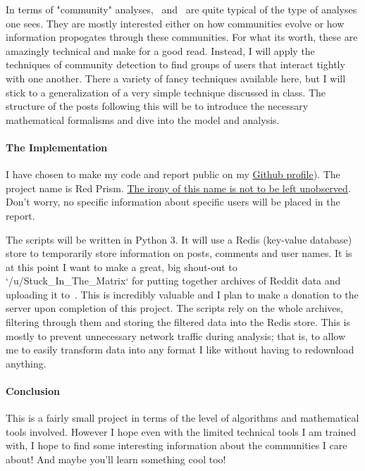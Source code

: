 In terms of "community" analyses,~\cite{c4} and~\cite{c5} are quite typical of the type of analyses one sees.
They are mostly interested either on how communities evolve or how information propogates through these communities.
For what its worth, these are amazingly technical and make for a good read.
Instead, I will apply the techniques of community detection to find groups of users that interact tightly with one another.
There a variety of fancy techniques available here, but I will stick to a generalization of a very simple technique discussed in class.
The structure of the posts following this will be to introduce the necessary mathematical formalisms and dive into the model and analysis.

\paragraph{The Implementation}
I have chosen to make my code and report public on my \href{https://github.com/rollends/red-prism}{Github profile}). The project name is Red Prism.
\href{https://en.wikipedia.org/wiki/PRISM_(surveillance_program)}{The irony of this name is not to be left unobserved}.
Don't worry, no specific information about specific users will be placed in the report.

The scripts will be written in Python 3.
It will use a Redis (key-value database) store to temporarily store information on posts, comments and user names.
It is at this point I want to make a great, big shout-out to `/u/Stuck\_In\_The\_Matrix` for putting together archives of Reddit data and uploading it to~\cite{c6}.
This is incredibly valuable and I plan to make a donation to the server upon completion of this project.
The scripts rely on the whole archives, filtering through them and storing the filtered data into the Redis store.
This is mostly to prevent unnecessary network traffic during analysis;
that is, to allow me to easily transform data into any format I like without having to redownload anything.

\paragraph{Conclusion}
This is a fairly small project in terms of the level of algorithms and mathematical tools involved.
However I hope even with the limited technical tools I am trained with, I hope to find some interesting information about the communities I care about!
And maybe you'll learn something cool too!

